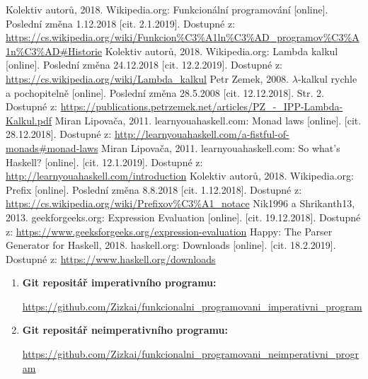 \documentclass[12pt,a4paper]{report}
\begin{document}
\begin{thebibliography}{99}

Kolektiv autorů, 2018. Wikipedia.org: Funkcionální programování [online]. Poslední změna 1.12.2018 [cit. 2.1.2019]. Dostupné z: \url{https://cs.wikipedia.org/wiki/Funkcion%C3%A1ln%C3%AD_programov%C3%A1n%C3%AD#Historie}  
Kolektiv autorů, 2018. Wikipedia.org: Lambda kalkul [online]. Poslední změna 24.12.2018 [cit. 12.2.2019]. Dostupné z: \url{https://cs.wikipedia.org/wiki/Lambda_kalkul}
Petr Zemek, 2008. $\lambda$-kalkul rychle a pochopitelně [online]. Poslední změna 28.5.2008 [cit. 12.12.2018]. Str. 2. Dostupné z: \url{https://publications.petrzemek.net/articles/PZ_-_IPP-Lambda-Kalkul.pdf}
Miran Lipovača, 2011. learnyouahaskell.com: Monad laws [online]. [cit. 28.12.2018]. Dostupné z: \url{http://learnyouahaskell.com/a-fistful-of-monads#monad-laws}
Miran Lipovača, 2011. learnyouahaskell.com: So what's Haskell? [online]. [cit. 12.1.2019]. Dostupné z: \url{http://learnyouahaskell.com/introduction}
Kolektiv autorů, 2018. Wikipedia.org: Prefix [online]. Poslední změna 8.8.2018 [cit. 1.12.2018]. Dostupné z: \url{https://cs.wikipedia.org/wiki/Prefixov%C3%A1_notace}
Nik1996 a Shrikanth13, 2013. geekforgeeks.org: Expression Evaluation [online].  [cit. 19.12.2018]. Dostupné z: \url{https://www.geeksforgeeks.org/expression-evaluation}
Happy: The Parser Generator for Haskell, 2018. haskell.org: Downloads [online].  [cit. 18.2.2019]. Dostupné z: \url{https://www.haskell.org/downloads}
\end{thebibliography}


\begin{enumerate}
\item \textbf{Git repositář imperativního programu:} 

\url{https://github.com/Zizkai/funkcionalni_programovani_imperativni_program}

\item \textbf{Git repositář neimperativního programu:}

\url{https://github.com/Zizkai/funkcionalni_programovani_neimperativni_program} 
\end{enumerate}

\openright
\end{document}
